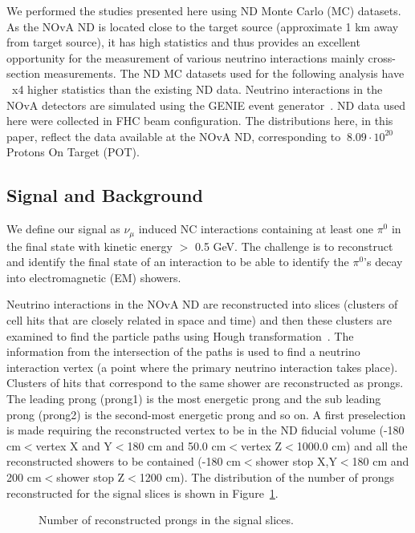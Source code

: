 \documentclass[12pt]{article}
\begin{document}
We performed the studies presented here using ND Monte Carlo (MC) datasets. As the NOvA ND is located close to the target source (approximate 1 km away from target source), it has high statistics and thus provides an excellent opportunity for the measurement of various neutrino interactions mainly cross-section measurements. The ND MC datasets used for the following analysis have ~x4 higher statistics than the existing ND data. Neutrino interactions in the NOvA detectors are simulated using the GENIE event generator~\cite{Andreopoulos}. ND data used here were collected in FHC beam configuration. The distributions here, in this paper, reflect the data available at the NOvA ND, corresponding to $~8.09\cdot10^{20}$ Protons On Target (POT).

\subsection{Signal and Background}

We define our signal as $\nu_{\mu}$ induced NC interactions containing at least one $\pi^{0}$ in the final state with kinetic energy $>$ 0.5 GeV. The challenge is to reconstruct and identify the final state of an interaction to be able to identify the $\pi^{0}$'s decay into electromagnetic (EM) showers.

Neutrino interactions in the NOvA ND are reconstructed into slices (clusters of cell hits that are closely related in space and time) and then these clusters are examined to find the particle paths using Hough transformation~\cite{Fernandes}. The information from the intersection of the paths is used to find a neutrino interaction vertex (a point where the primary neutrino interaction takes place). Clusters of hits that correspond to the same shower are reconstructed as prongs. The leading prong (prong1) is the most energetic prong and the sub leading prong (prong2) is the second-most energetic prong and so on. 
A first preselection is made requiring the reconstructed vertex to be in the ND fiducial volume (-180 cm$<$vertex X and Y$<$180 cm and 50.0 cm$<$vertex Z$<$1000.0 cm) and all the reconstructed showers to be contained (-180 cm$<$shower stop X,Y$<$180 cm and 200 cm$<$shower stop Z$<$1200 cm). The distribution of the number of prongs reconstructed for the signal slices is shown in Figure~\ref{fig:prongs3d}. 


\begin{figure}[htb]
\begin{center}
\caption{Number of reconstructed prongs in the signal slices.}
\label{fig:prongs3d}
\end{center}
\end{figure}
\end{document}
